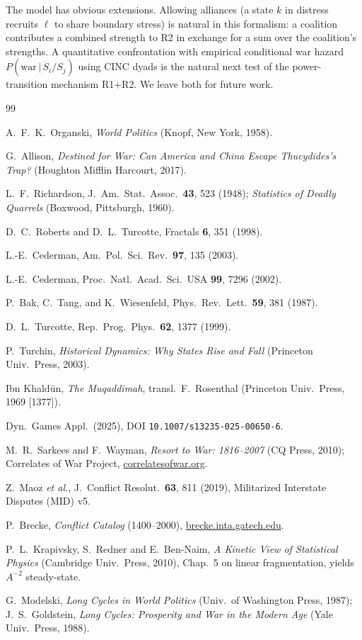 \documentclass[10pt,twocolumn]{article}
\begin{document}
The model has obvious extensions. Allowing alliances (a state $k$ in
distress recruits $\ell$ to share boundary stress) is natural in this
formalism: a coalition contributes a combined strength to R2 in
exchange for a sum over the coalition's strengths. A quantitative
confrontation with empirical conditional war hazard
$P(\text{war}\,|\,\dot S_i/S_j)$ using CINC dyads is the natural next
test of the power-transition mechanism R1+R2. We leave both for future
work.

\begin{thebibliography}{99}\small

A.~F.~K.~Organski, \emph{World Politics} (Knopf, New York, 1958).

G.~Allison, \emph{Destined for War: Can America and China Escape
Thucydides's Trap?} (Houghton Mifflin Harcourt, 2017).

L.~F.~Richardson, J.~Am.~Stat.~Assoc.\ \textbf{43}, 523 (1948);
\emph{Statistics of Deadly Quarrels} (Boxwood, Pittsburgh, 1960).

D.~C.~Roberts and D.~L.~Turcotte, Fractals \textbf{6}, 351 (1998).

L.-E.~Cederman, Am.\ Pol.\ Sci.\ Rev.\ \textbf{97}, 135 (2003).

L.-E.~Cederman, Proc.\ Natl.\ Acad.\ Sci.\ USA \textbf{99}, 7296 (2002).

P.~Bak, C.~Tang, and K.~Wiesenfeld, Phys.\ Rev.\ Lett.\ \textbf{59},
381 (1987).

D.~L.~Turcotte, Rep.\ Prog.\ Phys.\ \textbf{62}, 1377 (1999).

P.~Turchin, \emph{Historical Dynamics: Why States Rise and Fall}
(Princeton Univ.\ Press, 2003).

Ibn Khald\=un, \emph{The Muqaddimah}, transl.\ F.~Rosenthal (Princeton
Univ.\ Press, 1969 [1377]).

Dyn.\ Games Appl.\ (2025), DOI \texttt{10.1007/s13235-025-00650-6}.

M.~R.~Sarkees and F.~Wayman, \emph{Resort to War: 1816--2007}
(CQ Press, 2010); Correlates of War Project,
\href{https://correlatesofwar.org}{correlatesofwar.org}.

Z.~Maoz \emph{et al.}, J.~Conflict Resolut.\ \textbf{63}, 811 (2019),
Militarized Interstate Disputes (MID) v5.

P.~Brecke, \emph{Conflict Catalog} (1400--2000),
\href{http://brecke.inta.gatech.edu/research/conflict/}{brecke.inta.gatech.edu}.

P.~L.~Krapivsky, S.~Redner and E.~Ben-Naim,
\emph{A Kinetic View of Statistical Physics} (Cambridge Univ.\ Press,
2010), Chap.~5 on linear fragmentation, yields $A^{-2}$ steady-state.

G.~Modelski, \emph{Long Cycles in World Politics} (Univ.\ of Washington
Press, 1987); J.~S.~Goldstein, \emph{Long Cycles: Prosperity and War in
the Modern Age} (Yale Univ.\ Press, 1988).

\end{thebibliography}
\end{document}
